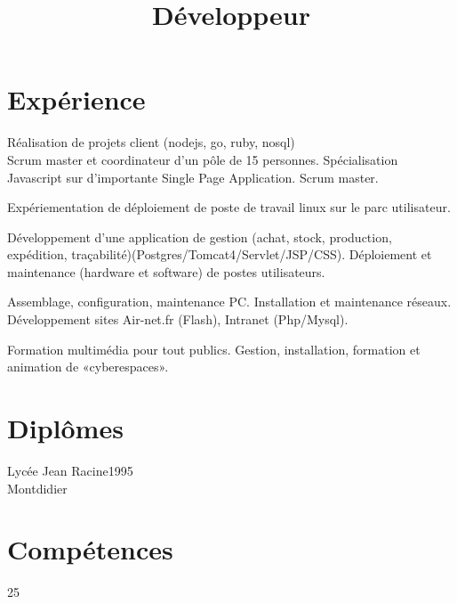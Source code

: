 \documentclass[a4paper,11pt]{cv4tw}
\title{D\'eveloppeur}
\begin{document}
  \section{Exp\'erience}
  {}
  {R\'ealisation de projets client (nodejs, go, ruby, nosql)\\ Scrum master et coordinateur d'un p\^ole de 15 personnes. Sp\'ecialisation Javascript sur d'importante Single Page Application. Scrum master.
  }

  {}
  {Exp\'eriementation de d\'eploiement de poste de travail linux sur le parc utilisateur.}

  {}
  {D\'eveloppement d'une application de gestion (achat, stock, production, exp\'edition, tra\c{c}abilit\'e)(Postgres/Tomcat4/Servlet/JSP/CSS).}
  {}
  {D\'eploiement et maintenance (hardware et software) de postes utilisateurs.}

  {}
  {Assemblage, configuration, maintenance PC. Installation et maintenance r\'eseaux. D\'eveloppement sites Air-net.fr (Flash), Intranet (Php/Mysql).}

  {}
  {Formation multim\'edia pour tout publics. Gestion, installation, formation et animation de «cyberespaces».}

  \section{Dipl\^omes}

   {Lyc\'ee Jean Racine}{1995\\Montdidier}{}{}

  \section{Comp\'etences}
  \begin{fields}{}{2}{5}
  \end{fields}
\end{document}
